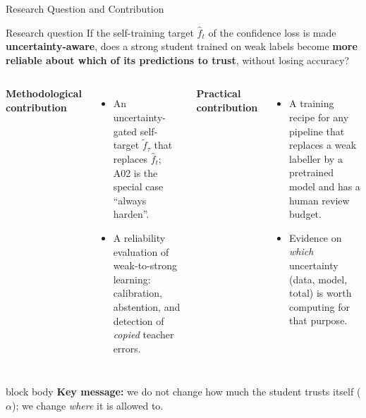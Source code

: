 \documentclass[aspectratio=169,11pt,professionalfonts]{beamer}
\newcommand{\keymsg}[1]{%
  \begin{beamercolorbox}[wd=\linewidth,rounded=true,sep=0.6em]{block body}
  \textbf{Key message:} #1
  \end{beamercolorbox}
}
\newcommand{\fhat}{\hat f_t}
\newcommand{\ftil}{\tilde f_\tau}
\begin{document}
\begin{frame}[t]{Research Question and Contribution}
\begin{block}{Research question}
If the self-training target $\fhat$ of the confidence loss is made \textbf{uncertainty-aware}, does a strong student
trained on weak labels become \textbf{more reliable about which of its predictions to trust}, without losing
accuracy?
\end{block}
\begin{columns}[T,totalwidth=\textwidth]
\small\textbf{Methodological contribution}
\begin{itemize}\footnotesize
  \item An uncertainty-gated self-target $\ftil$ that replaces $\fhat$; A02 is the special case ``always harden''.
  \item A reliability evaluation of weak-to-strong learning: calibration, abstention, and detection of
  \emph{copied} teacher errors.
\end{itemize}
\small\textbf{Practical contribution}
\begin{itemize}\footnotesize
  \item A training recipe for any pipeline that replaces a weak labeller by a pretrained model and has a
  human review budget.
  \item Evidence on \emph{which} uncertainty (data, model, total) is worth computing for that purpose.
\end{itemize}
\end{columns}
\vspace{0.5em}
\keymsg{we do not change how much the student trusts itself ($\alpha$); we change \emph{where} it is allowed to.}
\end{frame}
\end{document}
